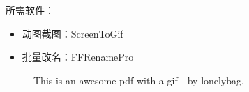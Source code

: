 \documentclass[a4paper]{ctexart}
\begin{document}
所需软件：
\begin{itemize}
	\item 动图截图：ScreenToGif
	\item 批量改名：FFRenamePro
\end{itemize}
\begin{figure}[!htb]
	\centering
	\vspace{-0.3cm}
	\caption{This is an awesome pdf with a gif - by lonelybag.}\label{fig:1}
\end{figure}
\end{document}
